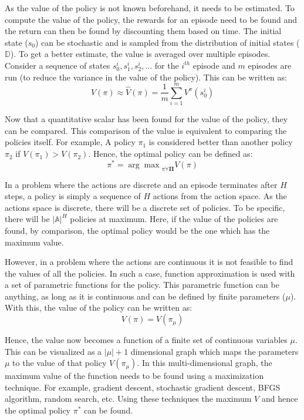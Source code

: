 \documentclass[hidelinks,BTech]{iitmdiss}
\begin{document}
As the value of the policy is not known beforehand, it needs to be estimated. To compute the value of the policy, the rewards for an episode need to be found and the return can then be found by discounting them based on time. The initial state ($s_0$) can be stochastic and is sampled from the distribution of initial states ($\mathbb{D}$). To get a better estimate, the value is averaged over multiple episodes. Consider a sequence of states ${s_{0}^{i}, s_{1}^{i}, s_{2}^{i}, ...}$ for the $i^{th}$ episode and $m$ episodes are run (to reduce the variance in the value of the policy). This can be written as:
\begin{equation}
  V(\pi) \approx \hat{V}(\pi) = \frac{1}{m} \sum_{i=1}^{m} V^{\pi} (s_{0}^{i})
\end{equation}

Now that a quantitative scalar has been found for the value of the policy, they can be compared. This comparison of the value is equivalent to comparing the policies itself. For example, A policy $\pi_{1}$ is considered better than another policy $\pi_{2}$ if $V(\pi_{1}) > V(\pi_{2})$. Hence, the optimal policy can be defined as:
\begin{equation}
  \pi^{*} = {\arg \max}_{\pi \forall \mathbf{\Pi}} {V(\pi)}
\end{equation}

In a problem where the actions are discrete and an episode terminates after $H$ steps, a policy is simply a sequence of $H$ actions from the action space. As the actions space is discrete, there will be a discrete set of policies. To be specific, there will be $|\mathbb{A}|^{H}$ policies at maximum. Here, if the value of the policies are found, by comparison, the optimal policy would be the one which has the maximum value.

However, in a problem where the actions are continuous it is not feasible to find the values of all the policies. In such a case, function approximation is used with a set of parametric functions for the policy. This parametric function can be anything, as long as it is continuous and can be defined by finite parameters ($\mu$). With this, the value of the policy can be written as:
\begin{equation}
  V(\pi) = V(\pi_{\mu})
\end{equation}

Hence, the value now becomes a function of a finite set of continuous variables $\mu$. This can be visualized as a $|\mu|+1$ dimensional graph which maps the parameters $\mu$ to the value of that policy $V(\pi_\mu)$. In this multi-dimensional graph, the maximum value of the function needs to be found using a maximization technique. For example, gradient descent, stochastic gradient descent, BFGS algorithm, random search, etc. Using these techniques the maximum $V$ and hence the optimal policy $\pi^{*}$ can be found.
\end{document}

